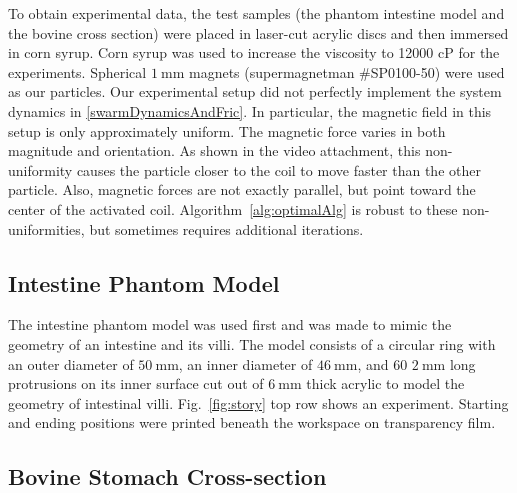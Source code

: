 To obtain experimental data, the test samples (the phantom intestine model and the bovine cross section) were placed in laser-cut acrylic discs and then immersed in corn syrup. Corn syrup was used to increase the viscosity to 12000 cP for the experiments. Spherical $\SI{1}{\milli\metre}$ magnets (supermagnetman \#SP0100-50) were used as our particles. Our experimental setup did not perfectly implement the system dynamics in \eqref{swarmDynamicsAndFric}. In particular, the magnetic field in this setup is only approximately uniform. The magnetic force varies in both magnitude and orientation. As shown in the video attachment, this non-uniformity causes the particle closer to the coil to move faster than the other particle. Also, magnetic forces are not exactly parallel, but point toward the center of the activated coil. Algorithm~\ref{alg:optimalAlg} is robust to these non-uniformities, but sometimes requires additional iterations.
 


\subsection{Intestine Phantom Model}

The intestine phantom model was used first and was made to mimic the geometry of an intestine and its villi. The model consists of a circular ring with an outer diameter of $\SI{50}{\milli\metre}$, an inner diameter of $\SI{46}{\milli\metre}$, and 60 $\SI{2}{\milli\metre}$ long protrusions on its inner surface cut out of $\SI{6}{\milli\metre}$ thick acrylic to model the geometry of intestinal villi. Fig.~\ref{fig:story} top row shows an experiment. Starting and ending positions were printed beneath the workspace on transparency film. 





\subsection{Bovine Stomach Cross-section}

